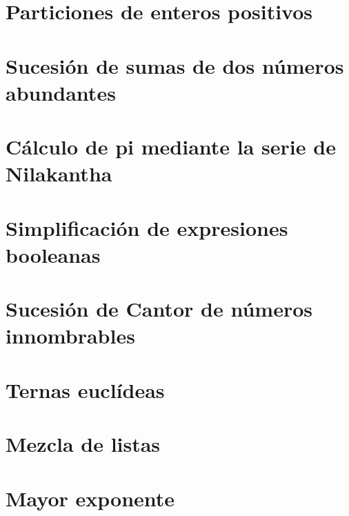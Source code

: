 \documentclass[a4paper,12pt,twoside]{book}
\begin{document}

\chapter{Particiones de enteros positivos}
\label{190211}

\chapter{Sucesión de sumas de dos números abundantes}
\label{190212}

\chapter{Cálculo de pi mediante la serie de Nilakantha}
\label{190213}

\chapter{Simplificación de expresiones booleanas}
\label{190214}

\chapter{Sucesión de Cantor de números innombrables}
\label{190215}


\chapter{Ternas euclídeas}
\label{190218}

\chapter{Mezcla de listas}
\label{190219}

\chapter{Mayor exponente}
\label{190220}
\end{document}
